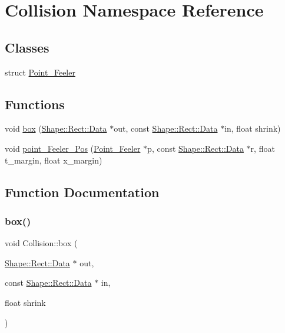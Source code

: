 \hypertarget{namespace_collision}{}\section{Collision Namespace Reference}
\label{namespace_collision}
\subsection*{Classes}
\begin{DoxyCompactItemize}
\item 
struct \mbox{\hyperlink{struct_collision_1_1_point___feeler}{Point\+\_\+\+Feeler}}
\end{DoxyCompactItemize}
\subsection*{Functions}
\begin{DoxyCompactItemize}
\item 
void \mbox{\hyperlink{namespace_collision_a3e85428348cfaf644953a114b30b0154}{box}} (\mbox{\hyperlink{struct_shape_1_1_rect_1_1_data}{Shape\+::\+Rect\+::\+Data}} $\ast$out, const \mbox{\hyperlink{struct_shape_1_1_rect_1_1_data}{Shape\+::\+Rect\+::\+Data}} $\ast$in, float shrink)
\item 
void \mbox{\hyperlink{namespace_collision_a2dc9bc6431ff0bf8511735ba027e1a23}{point\+\_\+\+Feeler\+\_\+\+Pos}} (\mbox{\hyperlink{struct_collision_1_1_point___feeler}{Point\+\_\+\+Feeler}} $\ast$p, const \mbox{\hyperlink{struct_shape_1_1_rect_1_1_data}{Shape\+::\+Rect\+::\+Data}} $\ast$r, float t\+\_\+margin, float x\+\_\+margin)
\end{DoxyCompactItemize}


\subsection{Function Documentation}
\mbox{\label{namespace_collision_a3e85428348cfaf644953a114b30b0154}} 
\subsubsection{\texorpdfstring{box()}{box()}}
{\footnotesize\ttfamily void Collision\+::box (\begin{DoxyParamCaption}\item[{\mbox{\hyperlink{struct_shape_1_1_rect_1_1_data}{Shape\+::\+Rect\+::\+Data}} $\ast$}]{out,  }\item[{const \mbox{\hyperlink{struct_shape_1_1_rect_1_1_data}{Shape\+::\+Rect\+::\+Data}} $\ast$}]{in,  }\item[{float}]{shrink }\end{DoxyParamCaption})}

